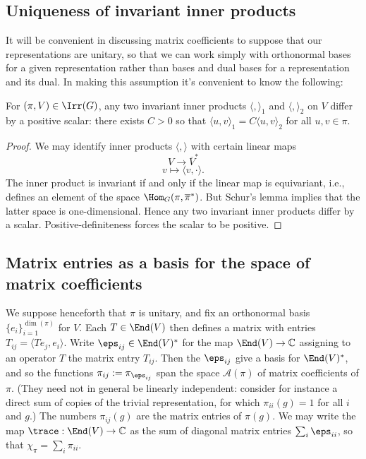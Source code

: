 \documentclass[reqno]{amsart} 
\begin{document}
\subsection{Uniqueness of invariant inner products}
It will be convenient in discussing matrix coefficients to suppose that our representations are unitary, so that we can work simply with orthonormal bases for a given representation rather than bases and dual bases for a representation and its dual.  In making this assumption it's convenient to know the following:
\begin{lemma}
  For $(\pi,V) \in \Irr(G)$, any two invariant inner products $\langle , \rangle_1$ and $\langle , \rangle_2$ on $V$ differ by a positive scalar: there exists $C > 0$ so that $\langle u,v \rangle_1 = C \langle u,v \rangle_2$ for all $u,v \in \pi$.
\end{lemma}
\begin{proof}
  We may identify inner products $\langle , \rangle$ with certain linear maps
  \begin{equation*}
    V \rightarrow \overline{V}^*
  \end{equation*}
  \begin{equation*}
    v \mapsto \langle v, \cdot \rangle.
  \end{equation*}
  The inner product is invariant if and only if the linear map is equivariant, i.e., defines an element of the space $\Hom_G(\pi, \overline{\pi }^*)$.  But Schur's lemma implies that the latter space is one-dimensional.  Hence any two invariant inner products differ by a scalar.  Positive-definiteness forces the scalar to be positive.
\end{proof}

\subsection{Matrix entries as a basis
  for the space of matrix coefficients}
We suppose henceforth that $\pi$ is unitary, and fix an orthonormal basis $\{e_i\}_{i=1}^{\dim(\pi)}$ for $V$.  Each $T \in \End(V)$ then defines a matrix with entries $T_{i j} = \langle T e_j, e_i \rangle$.  Write $\eps_{i j} \in \End(V)^*$ for the map $\End(V) \rightarrow \mathbb{C}$ assigning to an operator $T$ the matrix entry $T_{i j}$.  Then the $\eps_{i j}$ give a basis for $\End(V)^*$, and so the functions $\pi_{i j} := \pi_{\eps_{i j}}$ span the space $\mathcal{A}(\pi)$ of matrix coefficients of $\pi$.  (They need not in general be linearly independent: consider for instance a direct sum of copies of the trivial representation, for which $\pi_{i i}(g) = 1$ for all $i$ and $g$.)  The numbers $\pi_{i j}(g)$ are the matrix entries of $\pi(g)$.  We may write the map $\trace : \End(V) \rightarrow \mathbb{C}$ as the sum of diagonal matrix entries $\sum_i \eps_{i i}$, so that $\chi_\pi = \sum_i \pi_{i i}$.
\end{document}
